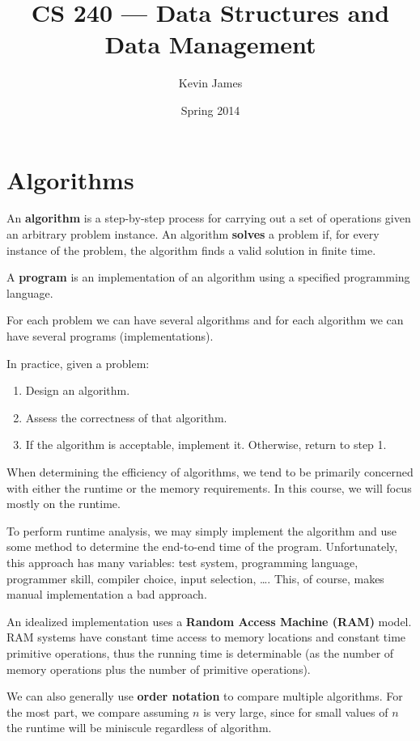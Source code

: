\documentclass[12pt]{article}
\begin{document}
\title{CS 240 --- Data Structures and Data Management}
\author{Kevin James}
\date{\vspace{-2ex}Spring 2014}
\maketitle\HRule

\tableofcontents
\newpage

\section{Algorithms}
An {\bf algorithm} is a step-by-step process for carrying out a set of operations given an arbitrary problem instance. An algorithm {\bf solves} a problem if, for every instance of the problem, the algorithm finds a valid solution in finite time.

A {\bf program} is an implementation of an algorithm using a specified programming language.

For each problem we can have several algorithms and for each algorithm we can have several programs (implementations).

In practice, given a problem:
\begin{enumerate}
\item Design an algorithm.
\item Assess the correctness of that algorithm.
\item If the algorithm is acceptable, implement it. Otherwise, return to step 1.
\end{enumerate}

When determining the efficiency of algorithms, we tend to be primarily concerned with either the runtime or the memory requirements. In this course, we will focus mostly on the runtime.

To perform runtime analysis, we may simply implement the algorithm and use some method to determine the end-to-end time of the program. Unfortunately, this approach has many variables: test system, programming language, programmer skill, compiler choice, input selection, \dots. This, of course, makes manual implementation a bad approach.

An idealized implementation uses a {\bf Random Access Machine (RAM)} model. RAM systems have constant time access to memory locations and constant time primitive operations, thus the running time is determinable (as the number of memory operations plus the number of primitive operations).

We can also generally use {\bf order notation} to compare multiple algorithms. For the most part, we compare assuming $n$ is very large, since for small values of $n$ the runtime will be miniscule regardless of algorithm.
\end{document}
